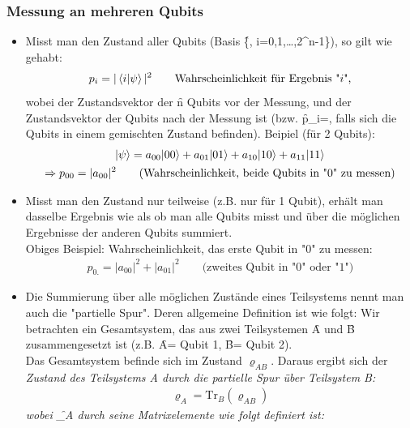 \subsubsection*{Messung an mehreren Qubits}
\begin{itemize}
    \item Misst man den Zustand aller Qubits (Basis \f{\left\{, i=0,1,\dots,2^{n}-1\right\}}), so gilt wie gehabt:
    \begin{gather*}
        p_i = |\left\langle i|\psi\right\rangle|^2\qquad\text{Wahrscheinlichkeit für Ergebnis "}i\text{",}
    \end{gather*}
    wobei \ket{\psi} der Zustandsvektor der \f{n} Qubits vor der Messung, und  der Zustandsvektor der Qubits nach der Messung ist (bzw. \f{p_i=\varrho{}}, falls sich die Qubits in einem gemischten Zustand befinden). Beipiel (für 2 Qubits):
    \begin{gather*}
        |\psi\rangle = a_{00}|00\rangle+a_{01}|01\rangle+a_{10}|10\rangle+a_{11}|11\rangle\\
        \Rightarrow p_{00} = |a_{00}|^2\qquad\text{(Wahrscheinlichkeit, beide Qubits in "0" zu messen)}
    \end{gather*}
    \item Misst man den Zustand nur teilweise (z.B. nur für 1 Qubit), erhält man dasselbe Ergebnis wie als ob man alle Qubits misst und über die möglichen Ergebnisse der anderen Qubits summiert.\\
    Obiges Beispiel: Wahrscheinlichkeit, das erste Qubit in "0" zu messen:
    \begin{gather*}
        p_{0.} = |a_{00}|^2 + |a_{01}|^2\qquad\text{(zweites Qubit in "0" oder "1")}
    \end{gather*}
    \item Die Summierung über alle möglichen Zustände eines Teilsystems nennt man auch die "partielle Spur". Deren allgemeine Definition ist wie folgt: Wir betrachten ein Gesamtsystem, das aus zwei Teilsystemen \f{A} und \f{B} zusammengesetzt ist (z.B. \f{A=} Qubit 1, \f{B=} Qubit 2).\\
    Das Gesamtsystem befinde sich im Zustand \(\varrho_{AB}\). Daraus ergibt sich der \it{Zustand des Teilsystems A} durch die partielle Spur \it{über Teilsystem B}:
    \begin{gather*}
        \varrho_A = \text{Tr}_B(\varrho_{AB})
    \end{gather*}
    wobei \f{\varrho_A} durch seine Matrixelemente wie folgt definiert ist:
    \begin{gather*}

\end{gather*}
\end{itemize}
